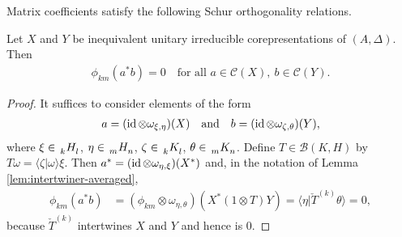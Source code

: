  Matrix coefficients  satisfy the following Schur orthogonality relations.
\begin{Lem}\label{lem:schur-1}
  Let $X$ and $Y$ be inequivalent unitary irreducible corepresentations of $(A,\Delta)$. Then
  \begin{align*}
    \phi_{km}(a^{*}b) = 0 \quad \text{for all } a\in \mathcal{C}(X), \ b\in \mathcal{C}(Y).
  \end{align*}
\end{Lem}
\begin{proof}
It suffices to  consider elements of the form
  \begin{align*}
    a = (\operatorname{id}\otimes \omega_{\xi,\eta})(X) \quad\text{and}  \quad b=(\operatorname{id} \otimes \omega_{\zeta,\theta})(Y),
  \end{align*}
  where $\xi \in \Grd{H}{k}{l}$, $\eta\in \Grd{H}{m}{n}$, $\zeta \in \Grd{K}{k}{l}$, $\theta \in
  \Grd{K}{m}{n}$. Define $T\in \mathcal{B}(K,H)$ by $T\omega = \langle \zeta|\omega\rangle \xi$. 
  Then $a^{*}=(\operatorname{id} \otimes \omega_{\eta,\xi})(X^{*})$ and, in the notation of Lemma \ref{lem:intertwiner-averaged},
  \begin{align*}
    \phi_{km}(a^{*}b) &= (\phi_{km} \otimes \omega_{\eta,\theta})(X^{*}(1\otimes T)Y) 
 = \langle \eta|
     \check{T}^{(k)} \theta\rangle = 0,
  \end{align*}
  because $\check{T}^{(k)}$ intertwines $X$  and $Y$  and hence is $0$.
\end{proof}

